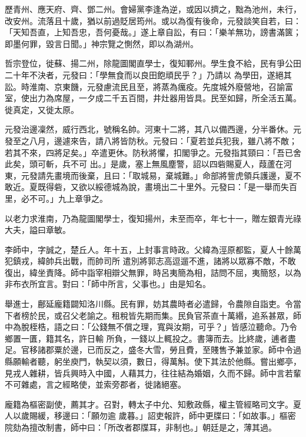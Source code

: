 \begin{pinyinscope}
 歷青州、應天府、齊、鄧二州。會婦黨李逢為逆，或因以擠之，黜為池州，未行，改安州。流落且十歲，猶以前過貶居筠州。或以為復有後命，元發談笑自若，曰：「天知吾直，上知吾忠，吾何憂哉。」遂上章自訟，有曰：「樂羊無功，謗書滿篋；即墨何罪，毀言日聞。」神宗覽之惻然，即以為湖州。



 哲宗登位，徙蘇、揚二州，除龍圖閣直學士，復知鄆州。學生食不給，民有爭公田二十年不決者，元發曰：「學無食而以良田飽頑民乎？」乃請以
 為學田，遂絕其訟。時淮南、京東饑，元發慮流民且至，將蒸為癘疫。先度城外廢營地，召諭富室，使出力為席屋，一夕成二千五百間，井灶器用皆具。民至如歸，所全活五萬。徙真定，又徙太原。



 元發治邊凜然，威行西北，號稱名帥。河東十二將，其八以備西邊，分半番休。元發至之八月，邊遽來告，請八將皆防秋。元發曰：「夏若並兵犯我，雖八將不敵；若其不來，四將足矣。」卒遣更休。防秋將懼，扣閣爭之。元發指其頸曰：「吾已舍此矣，頭可斬，兵不可
 出。」是歲，塞上無風塵警，詔以四砦賜夏人，葭蘆在河東，元發請先畫境而後棄，且曰：「取城易，棄城難。」命部將訾虎領兵護邊，夏不敢近。夏既得砦，又欲以綏德城為說，畫境出二十里外。元發曰：「是一舉而失百里，必不可。」九上章爭之。



 以老力求淮南，乃為龍圖閣學士，復知揚州，未至而卒，年七十一，贈左銀青光祿大夫，謚曰章敏。



 李師中，字誠之，楚丘人。年十五，上封事言時政。父緯為涇原都監，夏人十餘萬犯鎮戎，緯帥兵出戰，而帥司所
 遣別將郭志高逗遛不進，諸將以眾寡不敵，不敢復出，緯坐責降。師中詣宰相辯父無罪，時呂夷簡為相，詰問不屈，夷簡怒，以為非布衣所宜言。對曰：「師中所言，父事也。」由是知名。



 舉進士，鄜延龐籍闢知洛川縣。民有罪，妨其農時者必遣歸，令農隙自詣吏。令當下者榜於民，或召父老諭之。租稅皆先期而集。民負官茶直十萬緡，追系甚眾，師中為脫桎梏，語之曰：「公錢無不償之理，寬與汝期，可乎？」皆感泣聽命。乃令鄉置一匱，籍其名，許日輸
 所負，一錢以上輒投之。書簿而去。比終歲，逋者盡足。官移諸郡粟於邊，已而反之，盛冬大雪，勞且費，至賤售予兼並家。師中令過縣願輸者聽，躬坐庾門，執契以須，數日，得萬斛。使下其法於他縣。嘗出鄉亭，見戎人雜耕，皆兵興時入中國，人藉其力，往往結為婚姻，久而不歸。師中言若輩不可雜處，言之經略使，並索旁郡者，徙諸絕塞。



 龐籍為樞密副使，薦其才。召對，轉太子中允、知敷政縣，權主管經略司文字。夏人以歲賜緩，移邊曰：「願勿逾
 歲暮。」詔吏報許，師中更牒曰：「如故事。」樞密院劾為擅改制書，師中曰：「所改者郡牒耳，非制也。」朝廷是之，薄其過。




\end{pinyinscope}

